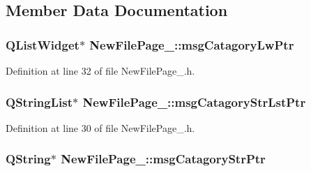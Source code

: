 \subsection{Member Data Documentation}
\hypertarget{class_new_file_page__3_ae9367af4aff708fc95ed9c4a17367523}{
\subsubsection[{msg\-Catagory\-Lw\-Ptr}]{\setlength{\rightskip}{0pt plus 5cm}Q\-List\-Widget$\ast$ New\-File\-Page\-\_\-::msg\-Catagory\-Lw\-Ptr\hspace{0.3cm}{\ttfamily [private]}}}\label{class_new_file_page__3_ae9367af4aff708fc95ed9c4a17367523}


Definition at line 32 of file New\-File\-Page\-\_.\-h.

\hypertarget{class_new_file_page__3_a77486a3682ab46459e11b679db6fb9b2}{
\subsubsection[{msg\-Catagory\-Str\-Lst\-Ptr}]{\setlength{\rightskip}{0pt plus 5cm}Q\-String\-List$\ast$ New\-File\-Page\-\_\-::msg\-Catagory\-Str\-Lst\-Ptr\hspace{0.3cm}{\ttfamily [private]}}}\label{class_new_file_page__3_a77486a3682ab46459e11b679db6fb9b2}


Definition at line 30 of file New\-File\-Page\-\_.\-h.

\hypertarget{class_new_file_page__3_a96edaebd6c24a640a001464ae9b339d3}{
\subsubsection[{msg\-Catagory\-Str\-Ptr}]{\setlength{\rightskip}{0pt plus 5cm}Q\-String$\ast$ New\-File\-Page\-\_\-::msg\-Catagory\-Str\-Ptr\hspace{0.3cm}{\ttfamily [private]}}}\label{class_new_file_page__3_a96edaebd6c24a640a001464ae9b339d3}


